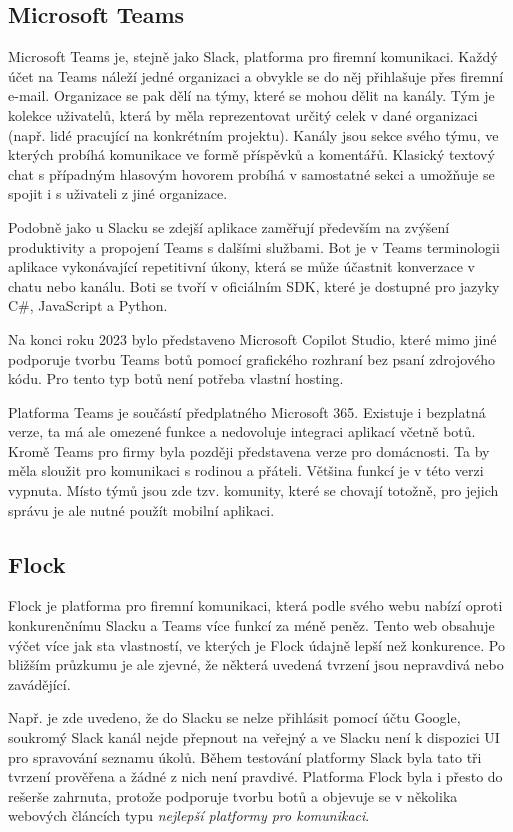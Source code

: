 \documentclass[FM]{tulthesis}
\begin{document}
	\subsection{Microsoft Teams}
	
	Microsoft Teams je, stejně jako Slack, platforma pro firemní komunikaci. Každý účet na Teams náleží jedné organizaci a obvykle se do něj přihlašuje přes firemní e-mail. Organizace se pak dělí na týmy, které se mohou dělit na kanály. Tým je kolekce uživatelů, která by měla reprezentovat určitý celek v dané organizaci (např. lidé pracující na konkrétním projektu). Kanály jsou sekce svého týmu, ve kterých probíhá komunikace ve formě příspěvků a komentářů. Klasický textový chat s případným hlasovým hovorem probíhá v samostatné sekci a umožňuje se spojit i s uživateli z jiné organizace.
	
	Podobně jako u Slacku se zdejší aplikace zaměřují především na zvýšení produktivity a propojení Teams s dalšími službami. Bot je v Teams terminologii aplikace vykonávající repetitivní úkony, která se může účastnit konverzace v chatu nebo kanálu. Boti se tvoří v oficiálním SDK, které je dostupné pro jazyky C\#, JavaScript a Python.
	
	Na konci roku 2023 bylo představeno Microsoft Copilot Studio, které mimo jiné podporuje tvorbu Teams botů pomocí grafického rozhraní bez psaní zdrojového kódu. Pro tento typ botů není potřeba vlastní hosting.
	
	Platforma Teams je součástí předplatného Microsoft 365. Existuje i bezplatná verze, ta má ale omezené funkce a nedovoluje integraci aplikací včetně botů. Kromě Teams pro firmy byla později představena verze pro domácnosti. Ta by měla sloužit pro komunikaci s rodinou a přáteli. Většina funkcí je v této verzi vypnuta. Místo týmů jsou zde tzv. komunity, které se chovají totožně, pro jejich správu je ale nutné použít mobilní aplikaci.
	
	\subsection{Flock}
	
	Flock je platforma pro firemní komunikaci, která podle svého webu nabízí oproti konkurenčnímu Slacku a Teams více funkcí za méně peněz. Tento web obsahuje výčet více jak sta vlastností, ve kterých je Flock údajně lepší než konkurence. Po bližším průzkumu je ale zjevné, že některá uvedená tvrzení jsou nepravdivá nebo zavádějící.
	
	Např. je zde uvedeno, že do Slacku se nelze přihlásit pomocí účtu Google, soukromý Slack kanál nejde přepnout na veřejný a ve Slacku není k dispozici UI pro spravování seznamu úkolů. Během testování platformy Slack byla tato tři tvrzení prověřena a žádné z nich není pravdivé. Platforma Flock byla i přesto do rešerše zahrnuta, protože podporuje tvorbu botů a objevuje se v několika webových článcích typu \textit{nejlepší platformy pro komunikaci}.
	
\end{document}
